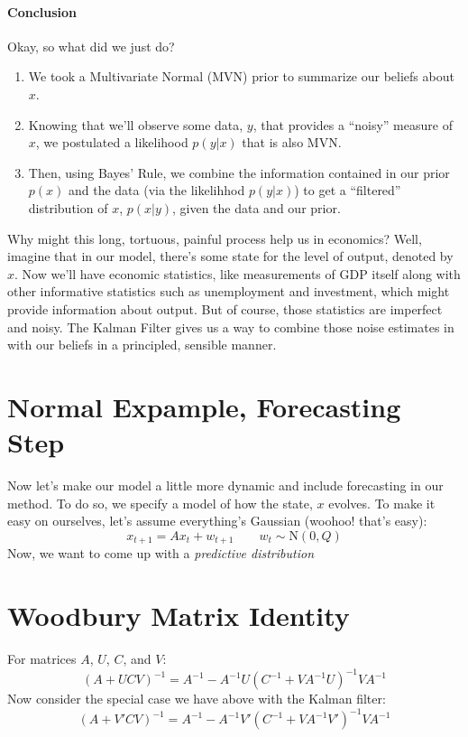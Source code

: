 \documentclass[a4paper,12pt]{scrartcl}
\begin{document}
\paragraph{Conclusion} Okay, so what did we just do? 
\begin{enumerate} 
    \item We took a Multivariate Normal (MVN) prior to 
	summarize our beliefs about $x$. 
    \item Knowing that we'll observe some data, $y$, that 
	provides a ``noisy'' measure of $x$, we postulated a 
	likelihood $p(y|x)$ that is also MVN. 
    \item Then, using Bayes' Rule, we combine the information
	contained in our prior $p(x)$ and the data (via
	the likelihhod $p(y|x)$) to get a ``filtered'' 
	distribution of $x$, $p(x|y)$, given the data and our
	prior.
\end{enumerate} 
Why might this long, tortuous, painful process help us in
economics?  Well, imagine that in our model, there's some 
state for the level of output, denoted by $x$.  Now we'll have
economic statistics, like measurements of GDP itself along 
with other informative statistics such as unemployment 
and investment, which might provide information about output.
But of course, those statistics are imperfect and noisy.  The
Kalman Filter gives us a way to combine those noise estimates
in with our beliefs in a principled, sensible manner.


\section{Normal Expample, Forecasting Step}

Now let's make our model a little more dynamic and include
forecasting in our method. To do so, we specify a model
of how the state, $x$ evolves.  To make it easy on ourselves,
let's assume everything's Gaussian (woohoo! that's easy):
\begin{equation}
    x_{t+1} = Ax_t + w_{t+1} \qquad w_t \sim \text{N}(0, Q)
\end{equation}
Now, we want to come up with a \emph{predictive distribution}







\newpage
\appendix

\section{Woodbury Matrix Identity}

For matrices $A$, $U$, $C$, and $V$:
\begin{equation}
    (A+UCV)^{-1} = A^{-1} - A^{-1} U(C^{-1} + VA^{-1}U)^{-1}
	VA^{-1}
\end{equation}
Now consider the special case we have above with the
Kalman filter:
\begin{equation}
    \label{special}
    (A + V'CV)^{-1} = A^{-1} - A^{-1} V'(C^{-1} + VA^{-1}V')^{-1}
	VA^{-1}
\end{equation}
\end{document}
